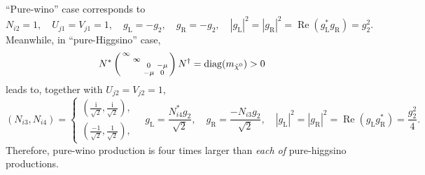 \documentclass[a4paper,10pt,captions=tableheading,DIV=14]{scrartcl}
\numberwithin{equation}{section}
\newcommand\w[1]{_{\mathrm{#1}}}
\newcommand\ii{\mathrm{i}}
\DeclareMathOperator{\diag}{\mathrm{diag}}
\renewcommand{\Re}{\mathop{\mathrm{Re}}}
\newcommand\neut  [1][\relax]{{\tilde\chi^0_{#1}}}
\newcommand{\gL}{g\w L}
\newcommand{\gR}{g\w R}
\begin{document}
``Pure-wino'' case corresponds to
\begin{equation}
 N_{i2}=1,\quad U_{j1}=V_{j1}=1,\quad
 \gL = -g_2, \quad \gR = -g_2,\quad
|\gL|^2=|\gR|^2=\Re(\gL^*\gR) = g_2^2.
\end{equation}
Meanwhile, in ``pure-Higgsino'' case, 
\begin{equation}
 N^*\left(
\begin{smallmatrix}
\infty & & & \\ & \infty & & \\ & & 0 & -\mu \\ & & -\mu & 0
\end{smallmatrix}
\right)
N^\dagger = \diag(m_{\neut})>0
\end{equation}
leads to, together with $U_{j2}=V_{j2}=1$,
\begin{equation}
 (N_{i3}, N_{i4})=
\begin{cases}
 (\frac{\ii}{\sqrt2},\frac{\ii}{\sqrt2}),\\
 (\frac{-1}{\sqrt2},\frac1{\sqrt2}),
\end{cases}
\quad \gL = \frac{N^*_{i4}g_2}{\sqrt2}, \quad \gR = \frac{-N_{i3}g_2}{\sqrt2},
\quad
 |\gL|^2=|\gR|^2=\Re(\gL\gR^*)=\frac{g_2^2}{4}.
\end{equation}
Therefore, pure-wino production is four times larger than \emph{each of} pure-higgsino productions.



\end{document}
